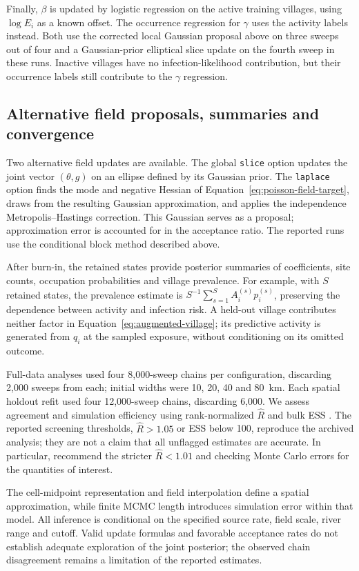 Finally, $\beta$ is updated by logistic regression on the active training villages, using $\log E_i$ as a known offset. The occurrence regression for $\gamma$ uses the activity labels instead. Both use the corrected local Gaussian proposal above on three sweeps out of four and a Gaussian-prior elliptical slice update on the fourth sweep in these runs. Inactive villages have no infection-likelihood contribution, but their occurrence labels still contribute to the $\gamma$ regression.

\subsection{Alternative field proposals, summaries and convergence}

Two alternative field updates are available. The global \texttt{slice} option updates the joint vector $(\theta,g)$ on an ellipse defined by its Gaussian prior. The \texttt{laplace} option finds the mode and negative Hessian of Equation~\eqref{eq:poisson-field-target}, draws from the resulting Gaussian approximation, and applies the independence Metropolis--Hastings correction. This Gaussian serves as a proposal; approximation error is accounted for in the acceptance ratio. The reported runs use the conditional block method described above.

After burn-in, the retained states provide posterior summaries of coefficients, site counts, occupation probabilities and village prevalence. For example, with $S$ retained states, the prevalence estimate is $S^{-1}\sum_{s=1}^S A_i^{(s)}p_i^{(s)}$, preserving the dependence between activity and infection risk. A held-out village contributes neither factor in Equation~\eqref{eq:augmented-village}; its predictive activity is generated from $q_i$ at the sampled exposure, without conditioning on its omitted outcome.

Full-data analyses used four 8,000-sweep chains per configuration, discarding 2,000 sweeps from each; initial widths were 10, 20, 40 and 80~km. Each spatial holdout refit used four 12,000-sweep chains, discarding 6,000. We assess agreement and simulation efficiency using rank-normalized $\widehat R$ and bulk ESS \citep{vehtari2021}. The reported screening thresholds, $\widehat R>1.05$ or ESS below 100, reproduce the archived analysis; they are not a claim that all unflagged estimates are accurate. In particular, \citet[Section~2]{vehtari2021} recommend the stricter $\widehat R<1.01$ and checking Monte Carlo errors for the quantities of interest.

The cell-midpoint representation and field interpolation define a spatial approximation, while finite MCMC length introduces simulation error within that model. All inference is conditional on the specified source rate, field scale, river range and cutoff. Valid update formulas and favorable acceptance rates do not establish adequate exploration of the joint posterior; the observed chain disagreement remains a limitation of the reported estimates.
